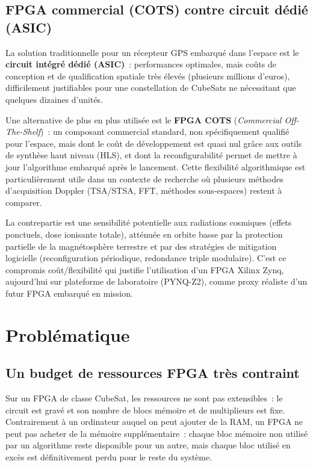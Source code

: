 \documentclass[11pt,a4paper]{article}
\providecommand{\og}{\guillemotleft{}}
\providecommand{\fg}{\guillemotright{}}
\begin{document}
\subsection{FPGA commercial (COTS) contre circuit dédié (ASIC)}

La solution traditionnelle pour un récepteur GPS embarqué dans l'espace est le \textbf{circuit intégré dédié (ASIC)}~: performances optimales, mais coûts de conception et de qualification spatiale très élevés (plusieurs millions d'euros), difficilement justifiables pour une constellation de CubeSats ne nécessitant que quelques dizaines d'unités.

Une alternative de plus en plus utilisée est le \textbf{FPGA COTS} (\textit{Commercial Off-The-Shelf})~: un composant commercial standard, non spécifiquement qualifié pour l'espace, mais dont le coût de développement est quasi nul grâce aux outils de synthèse haut niveau (HLS), et dont la reconfigurabilité permet de mettre à jour l'algorithme embarqué après le lancement. Cette flexibilité algorithmique est particulièrement utile dans un contexte de recherche où plusieurs méthodes d'acquisition Doppler (TSA/STSA, FFT, méthodes sous-espaces) restent à comparer.

La contrepartie est une sensibilité potentielle aux radiations cosmiques (effets ponctuels, dose ionisante totale), atténuée en orbite basse par la protection partielle de la magnétosphère terrestre et par des stratégies de mitigation logicielle (reconfiguration périodique, redondance triple modulaire). C'est ce compromis coût/flexibilité qui justifie l'utilisation d'un FPGA Xilinx Zynq, aujourd'hui sur plateforme de laboratoire (PYNQ-Z2), comme proxy réaliste d'un futur FPGA embarqué en mission.

\section{Problématique}
\label{sec:problematique}

\subsection{Un budget de ressources FPGA très contraint}

Sur un FPGA de classe CubeSat, les ressources ne sont pas extensibles~: le circuit est gravé et son nombre de blocs mémoire et de multiplieurs est fixe. Contrairement à un ordinateur auquel on peut ajouter de la RAM, un FPGA ne peut pas \og{}acheter\fg{} de la mémoire supplémentaire~: chaque bloc mémoire non utilisé par un algorithme reste disponible pour un autre, mais chaque bloc utilisé en excès est définitivement perdu pour le reste du système.
\end{document}
